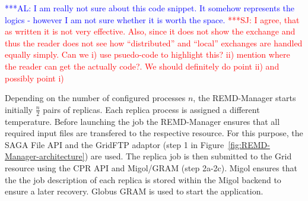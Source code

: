 \documentclass[conference,final]{IEEEtran}
\newcommand{\alnote}[1]{ {\textcolor{blue} { ***AL: #1 }}}
\newcommand{\jhanote}[1]{ {\textcolor{red} { ***SJ: #1 }}}
\newcommand{\alnote}[1]{}
\newcommand{\jhanote}[1]{}
\begin{document}
                                  
\alnote{I am really not sure about this code snippet. It somehow
  represents the logics - however I am not sure whether it is worth
  the space.} \jhanote{I agree, that as written it is not very
  effective. Also, since it does not show the exchange and thus the
  reader does not see how ``distributed'' and ``local'' exchanges are
  handled equally simply. Can we i) use psuedo-code to highlight this?
  ii) mention where the reader can get the actually code?. We should
  definitely do point ii) and possibly point i)}



Depending on the number of configured processes $n$, the REMD-Manager
starts initially $\frac{n}{2}$ pairs of replicas.  Each replica
process is assigned a different temperature. Before launching the job
the REMD-Manager ensures that all required input files are transfered
to the respective resource. For this purpose, the SAGA File API and
the GridFTP adaptor (step 1 in
Figure~\ref{fig:REMD-Manager-architecture}) are used.  The replica job
is then submitted to the Grid resource using the CPR API and
Migol/GRAM (step 2a-2c). Migol ensures that the the job description of
each replica is stored within the Migol backend to ensure a later
recovery. Globus GRAM is used to start the application.
                                               
\end{document}
